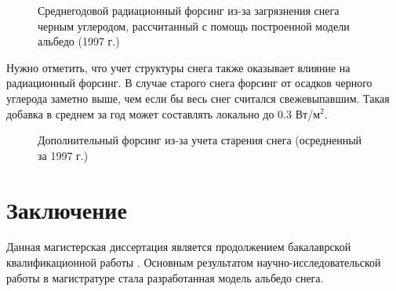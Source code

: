 \documentclass[a4paper, fontsize=14pt]{scrartcl}
\begin{document}
\begin{figure}[h]
    \caption{Среднегодовой радиационный форсинг из-за загрязнения снега черным углеродом, рассчитанный с помощь построенной модели альбедо (1997 г.)}
    \label{fig:image}
\end{figure}

Нужно отметить, что учет структуры снега также оказывает влияние на радиационный форсинг. В случае старого снега форсинг от осадков черного углерода заметно выше, чем если бы весь снег считался свежевыпавшим. Такая добавка в среднем за год может составлять локально до $0.3$ Вт/м$^2$. 

\begin{figure}[h]
    \caption{Дополнительный форсинг из-за учета старения снега (осредненный за 1997 г.)}
    \label{fig:image}
\end{figure}


\newpage
\section*{Заключение}

Данная магистерская диссертация является продолжением бакалаврской квалификационной работы \cite{Bak2019}. Основным результатом научно-исследовательской работы в магистратуре стала разработанная модель альбедо снега. 
\end{document}
